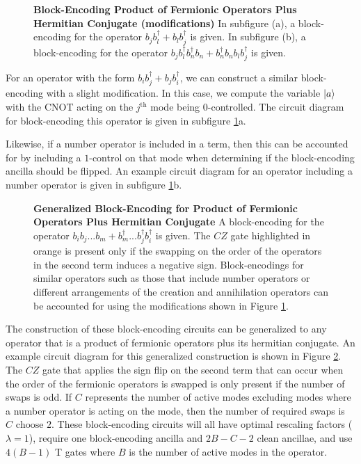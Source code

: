 \begin{figure}
    
    
    \caption{
        \textbf{Block-Encoding Product of Fermionic Operators Plus Hermitian Conjugate (modifications)}
        In subfigure (a), a block-encoding for the operator $b_j b_l^\dagger + b_l b_j^\dagger$ is given.
        In subfigure (b), a block-encoding for the operator $b_j b_l^\dagger b_n^\dagger b_n + b_n^\dagger b_n b_l b_j^\dagger$ is given.
    }
    \label{fig:fermionic-be-lc-modifications}
\end{figure}

For an operator with the form $b_i b_j^\dagger + b_j b_i^\dagger$, we can construct a similar block-encoding with a slight modification.
In this case, we compute the variable $\ket{a}$ with the CNOT acting on the $j^\text{th}$ mode being $0$-controlled.
The circuit diagram for block-encoding this operator is given in subfigure \ref{fig:fermionic-be-lc-modifications}a.

Likewise, if a number operator is included in a term, then this can be accounted for by including a $1$-control on that mode when determining if the block-encoding ancilla should be flipped.
An example circuit diagram for an operator including a number operator is given in subfigure \ref{fig:fermionic-be-lc-modifications}b.

\begin{figure}
    
    \caption{
        \textbf{Generalized Block-Encoding for Product of Fermionic Operators Plus Hermitian Conjugate}
        A block-encoding for the operator $b_i b_j ... b_m + b_m^\dagger ... b_j^\dagger b_i^\dagger$ is given.
        The $CZ$ gate highlighted in orange is present only if the swapping on the order of the operators in the second term induces a negative sign.
        Block-encodings for similar operators such as those that include number operators or different arrangements of the creation and annihilation operators can be accounted for using the modifications shown in Figure \ref{fig:fermionic-be-lc-modifications}.
    }
    \label{fig:fermionic-be-lc}
\end{figure}

The construction of these block-encoding circuits can be generalized to any operator that is a product of fermionic operators plus its hermitian conjugate.
An example circuit diagram for this generalized construction is shown in Figure \ref{fig:fermionic-be-lc}.
The $CZ$ gate that applies the sign flip on the second term that can occur when the order of the fermionic operators is swapped is only present if the number of swaps is odd.
If $C$ represents the number of active modes excluding modes where a number operator is acting on the mode, then the number of required swaps is $C \text{ choose } 2$.
These block-encoding circuits will all have optimal rescaling factors ($\lambda=1$), require one block-encoding ancilla and $2B - C - 2$ clean ancillae, and use $4(B-1)$ T gates where $B$ is the number of active modes in the operator.

